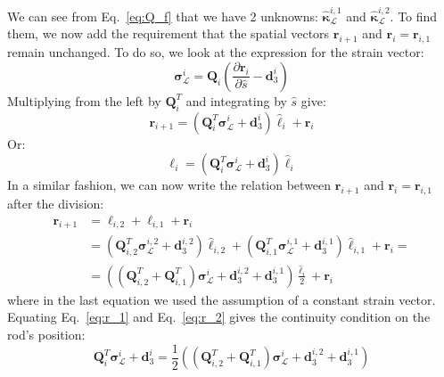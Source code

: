 \documentclass[a4paper, 11pt]{article}
\begin{document}
We can see from Eq.~\ref{eq:Q_f} that we have 2 unknowns: $\hat{\boldsymbol{\kappa}}^{i,1}_\mathcal{L}$ and $\hat{\boldsymbol{\kappa}}^{i,2}_\mathcal{L}$. To find them, we now add the requirement that the spatial vectors $\boldsymbol{r}_{i+1} $ and $\boldsymbol{r}_{i}=\boldsymbol{r}_{i,1}$ remain unchanged. To do so, we look at the expression for the strain vector:
\begin{equation}
    \boldsymbol{\sigma}^i_\mathcal{L}=\boldsymbol{Q}_i\left(\frac{\partial \boldsymbol{r}_i}{\partial \hat{s}}-\boldsymbol{d}^i_3\right)
\end{equation}
Multiplying from the left by $\boldsymbol{Q}^T_i$ and integrating by $\hat{s}$ give:
\begin{equation}\label{eq:r_1}
    \boldsymbol{r}_{i+1}=\left(\boldsymbol{Q}^T_i\boldsymbol{\sigma}^i_\mathcal{L}+\boldsymbol{d}^i_3\right)\hat{\ell}_i+\boldsymbol{r}_{i}
\end{equation}
Or:
\begin{equation}
    \boldsymbol{\ell}_i=\left(\boldsymbol{Q}^T_i\boldsymbol{\sigma}^i_\mathcal{L}+\boldsymbol{d}^i_3\right)\hat{\ell}_i
\end{equation}
In a similar fashion, we can now write the relation between $\boldsymbol{r}_{i+1} $ and $\boldsymbol{r}_{i}=\boldsymbol{r}_{i,1}$ after the division:
\begin{align}
    \boldsymbol{r}_{i+1}&=\boldsymbol{\ell}_{i,2}+\boldsymbol{\ell}_{i,1}+\boldsymbol{r}_{i}\nonumber\\
    &=\left(\boldsymbol{Q}^T_{i,2}\boldsymbol{\sigma}^{i,2}_\mathcal{L}+\boldsymbol{d}^{i,2}_3\right)\hat{\ell}_{i,2}+\left(\boldsymbol{Q}^T_{i,1}\boldsymbol{\sigma}^{i,1}_\mathcal{L}+\boldsymbol{d}^{i,1}_3\right)\hat{\ell}_{i,1}+\boldsymbol{r}_{i}=\nonumber\\
    &=\left(\left(\boldsymbol{Q}^T_{i,2}+\boldsymbol{Q}^T_{i,1}\right)\boldsymbol{\sigma}^{i}_\mathcal{L}+\boldsymbol{d}^{i,2}_3+\boldsymbol{d}^{i,1}_3\right)\frac{\hat{\ell}_{i}}{2}+\boldsymbol{r}_{i}\label{eq:r_2}
\end{align}
where in the last equation we used the assumption of a constant strain vector.
Equating Eq.~\ref{eq:r_1} and Eq.~\ref{eq:r_2} gives the continuity condition on the rod's position:
\begin{equation}\label{eq:cond_pos}
    \boldsymbol{Q}^T_i\boldsymbol{\sigma}^i_\mathcal{L}+\boldsymbol{d}^i_3=\frac{1}{2}\left(\left(\boldsymbol{Q}^T_{i,2}+\boldsymbol{Q}^T_{i,1}\right)\boldsymbol{\sigma}^{i}_\mathcal{L}+\boldsymbol{d}^{i,2}_3+\boldsymbol{d}^{i,1}_3\right)
\end{equation}
\end{document}
